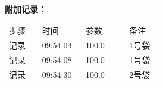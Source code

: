 \documentclass[UTF8,10pt,a4paper,fontset=fandol]{ctexart}
\newcommand{\fieldvalue}[1]{#1}
\begin{document}
\normalsize

\vspace{0.75em}

\noindent
\textbf{附加记录：}

\begin{tabular}{@{}p{0.19\linewidth}p{0.25\linewidth}p{0.25\linewidth}p{0.19\linewidth}@{}}
步骤 &
时间 &
参数 &
备注 \\
记录 &
\fieldvalue{09:54:04}
&
\fieldvalue{100.0}
&
\fieldvalue{1号袋}
\\
记录 &
\fieldvalue{09:54:08}
&
\fieldvalue{100.0}
&
\fieldvalue{1号袋}
\\
记录 &
\fieldvalue{09:54:30}
&
\fieldvalue{100.0}
&
\fieldvalue{2号袋}
\end{tabular}


\newpage
\end{document}
